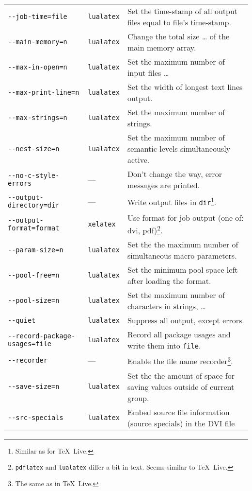 \documentclass{article}
\newcommand{\pdflatex}{\texttt{pdflatex}}
\newcommand{\lualatex}{\texttt{lualatex}}
\newcommand{\xelatex}{\texttt{xelatex}}
\newcommand{\texlive}{\TeX~Live}
\begin{document}
{\begin{longtable}{|lll|}
\texttt{-{}-job-time=file}           & \lualatex{} & Set the time-stamp of all output files equal to file's time-stamp. \\
\texttt{-{}-main-memory=n}           & \lualatex{} & Change the total size \dots{} of the main memory array. \\
\texttt{-{}-max-in-open=n}           & \lualatex{} & Set the maximum number of input files \dots \\
\texttt{-{}-max-print-line=n}        & \lualatex{} & Set the width of longest text lines output. \\
\texttt{-{}-max-strings=n}           & \lualatex{} & Set the maximum number of strings. \\
\texttt{-{}-nest-size=n}             & \lualatex{} & Set the maximum number of semantic levels simultaneously active. \\
\texttt{-{}-no-c-style-errors}       & ---         & Don't change the way, error messages are printed. \\
\texttt{-{}-output-directory=dir}    & ---         & Write output files in \texttt{dir}\footnote%
{Similar as for \texlive. }. \\
\texttt{-{}-output-format=format}    & \xelatex{}  & Use format for job output (one of: dvi, pdf)\footnote%
{\pdflatex{} and \lualatex{} differ a bit in text. Seems similar to \texlive. }. \\
\texttt{-{}-param-size=n}            & \lualatex{} & Set the the maximum number of simultaneous macro parameters. \\
\texttt{-{}-pool-free=n}             & \lualatex{} & Set the minimum pool space left after loading the format. \\
\texttt{-{}-pool-size=n}             & \lualatex{} & Set the maximum number of characters in strings, \dots \\
\texttt{-{}-quiet}                   & \lualatex{} & Suppress all output, except errors. \\
\texttt{-{}-record-package-usages=file} & \lualatex{} & Record all package usages and write them into \texttt{file}. \\
\texttt{-{}-recorder}                & ---         & Enable the file name recorder\footnote%
{The same as in \texlive. }. \\
\texttt{-{}-save-size=n}             & \lualatex{} & Set the the amount of space for saving values outside of current group. \\
\texttt{-{}-src-specials}            & \lualatex{} & Embed source file information (source specials) in the DVI file\footnote%

\end{longtable}}
\end{document}
